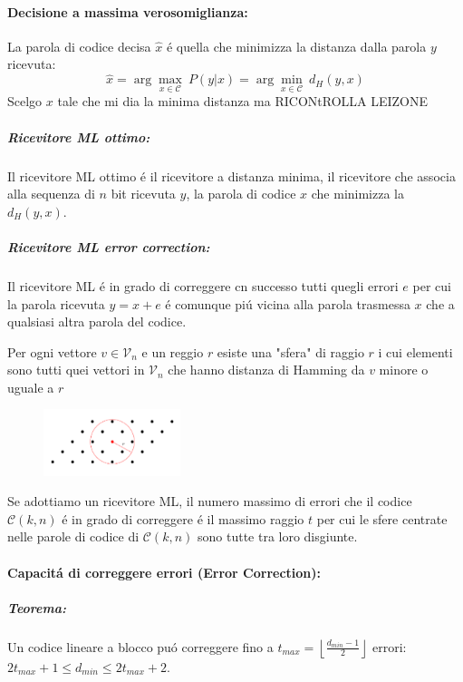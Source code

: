             \paragraph{Decisione a massima verosomiglianza:}\label{Decisione a massima verosomiglianza}
                La parola di codice decisa $\hat{x}$ é quella che minimizza la distanza dalla parola $y$ ricevuta:
                \[
                    \hat{x} = \arg \underset{x\in\mathcal{C}}{\max}\ P(y|x) = \arg \underset{x\in\mathcal{C}}{\min}\ d_H(y,x)
                \]
                Scelgo $x$ tale che mi dia la minima distanza ma RICONtROLLA LEIZONE
                \subparagraph{Ricevitore ML ottimo:} Il ricevitore ML ottimo é il ricevitore a distanza minima, il ricevitore
                che associa alla sequenza di $n$ bit ricevuta $y$, la parola di codice $x$ che minimizza la $d_H(y,x)$.
                \subparagraph{Ricevitore ML error correction:} Il ricevitore ML é in grado di correggere cn successo tutti quegli errori
                $e$ per cui la parola ricevuta $y = x+e$ é comunque piú vicina alla parola trasmessa $x$ che a qualsiasi altra parola del codice.
                
                Per ogni vettore $v\in\mathcal{V}_n$ e un reggio $r$ esiste una "sfera" di raggio $r$ i cui elementi sono tutti quei vettori in $\mathcal{V}_n$ che hanno
                distanza di Hamming da $v$ minore o uguale a $r$

                \begin{figure}[H]
                    \centering 
                    \includegraphics[width = 4cm]{media/sfera di amming.png}
                \label{sfera di Hamming}
                \end{figure}
                Se adottiamo un ricevitore ML, il numero massimo di errori che il codice $\mathcal{C}(k,n)$ é in grado di correggere é il massimo raggio $t$ per cui le sfere centrate nelle 
                parole di codice di $\mathcal{C}(k,n)$ sono tutte tra loro disgiunte.
            \paragraph{Capacitá di correggere errori (Error Correction):}
                \subparagraph{Teorema:}\begin{sloppypar}
                   Un codice lineare a blocco puó correggere fino a ${t_{max} = \left\lfloor \frac{d_{min}-1}{2} \right\rfloor}$ errori: $2t_{max}+1 \leq d_{min} \leq 2t_{max}+2$.
                \end{sloppypar}
                    
